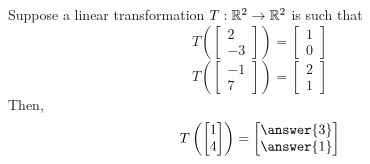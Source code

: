 \documentclass{ximera}
\author{Anna Davis}
\begin{document}
\begin{exercise}
Suppose a linear transformation $T:\mathbb{R}^2\rightarrow\mathbb{R}^2$ is such that 
$$T\left(\begin{bmatrix}2\\-3\end{bmatrix}\right)=\begin{bmatrix}1\\0\end{bmatrix}$$
$$T\left(\begin{bmatrix}-1\\7\end{bmatrix}\right)=\begin{bmatrix}2\\1\end{bmatrix}$$
Then, 
$$T\left(\begin{bmatrix}1\\4\end{bmatrix}\right)=\begin{bmatrix}\answer{3}\\\answer{1}\end{bmatrix}$$

 \end{exercise}
 
\end{document}

